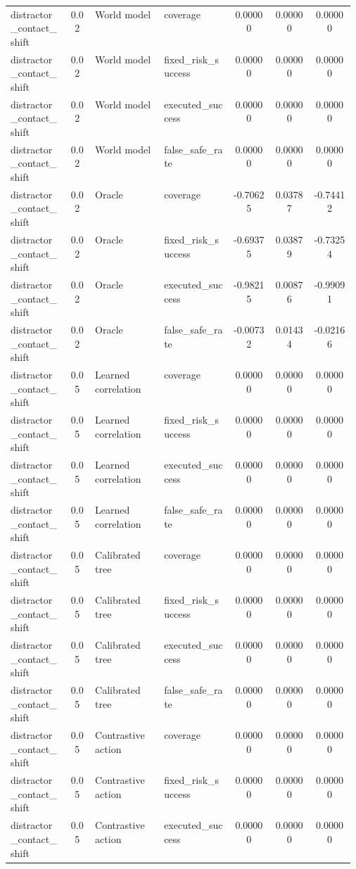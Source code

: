 \documentclass{article}
\begin{document}
\begin{center}
\begin{longtable}{p{0.17\linewidth}cp{0.20\linewidth}p{0.20\linewidth}ccc}
distractor\_contact\_shift & 0.02 & World model & coverage & 0.00000 & 0.00000 & 0.00000\\
distractor\_contact\_shift & 0.02 & World model & fixed\_risk\_success & 0.00000 & 0.00000 & 0.00000\\
distractor\_contact\_shift & 0.02 & World model & executed\_success & 0.00000 & 0.00000 & 0.00000\\
distractor\_contact\_shift & 0.02 & World model & false\_safe\_rate & 0.00000 & 0.00000 & 0.00000\\
distractor\_contact\_shift & 0.02 & Oracle & coverage & -0.70625 & 0.03787 & -0.74412\\
distractor\_contact\_shift & 0.02 & Oracle & fixed\_risk\_success & -0.69375 & 0.03879 & -0.73254\\
distractor\_contact\_shift & 0.02 & Oracle & executed\_success & -0.98215 & 0.00876 & -0.99091\\
distractor\_contact\_shift & 0.02 & Oracle & false\_safe\_rate & -0.00732 & 0.01434 & -0.02166\\
distractor\_contact\_shift & 0.05 & Learned correlation & coverage & 0.00000 & 0.00000 & 0.00000\\
distractor\_contact\_shift & 0.05 & Learned correlation & fixed\_risk\_success & 0.00000 & 0.00000 & 0.00000\\
distractor\_contact\_shift & 0.05 & Learned correlation & executed\_success & 0.00000 & 0.00000 & 0.00000\\
distractor\_contact\_shift & 0.05 & Learned correlation & false\_safe\_rate & 0.00000 & 0.00000 & 0.00000\\
distractor\_contact\_shift & 0.05 & Calibrated tree & coverage & 0.00000 & 0.00000 & 0.00000\\
distractor\_contact\_shift & 0.05 & Calibrated tree & fixed\_risk\_success & 0.00000 & 0.00000 & 0.00000\\
distractor\_contact\_shift & 0.05 & Calibrated tree & executed\_success & 0.00000 & 0.00000 & 0.00000\\
distractor\_contact\_shift & 0.05 & Calibrated tree & false\_safe\_rate & 0.00000 & 0.00000 & 0.00000\\
distractor\_contact\_shift & 0.05 & Contrastive action & coverage & 0.00000 & 0.00000 & 0.00000\\
distractor\_contact\_shift & 0.05 & Contrastive action & fixed\_risk\_success & 0.00000 & 0.00000 & 0.00000\\
distractor\_contact\_shift & 0.05 & Contrastive action & executed\_success & 0.00000 & 0.00000 & 0.00000\\

\end{longtable}
\end{center}
\end{document}
